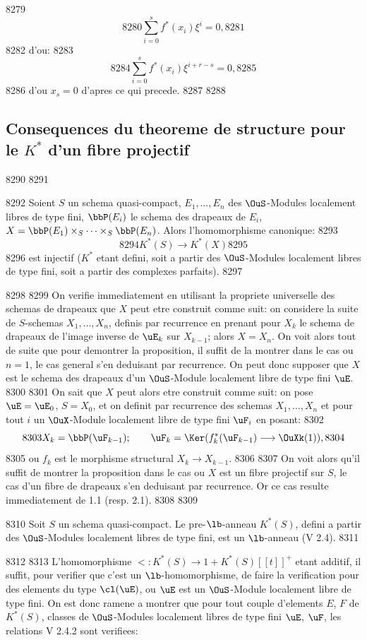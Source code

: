   8279	\[
  8280	\sum_{i=0}^{s} f^*(x_i)\xi^i = 0,
  8281	\]
  8282	d'ou:
  8283	\[
  8284	\sum_{i=0}^{s} f^*(x_i)\xi^{i+r-s} = 0,
  8285	\]
  8286	d'ou $x_s = 0$ d'apres ce qui precede.
  8287	
  8288		\subsection{Consequences du theoreme de structure pour le $K^*$ d'un fibre projectif}
  8290	
  8291	\begin{prop}
  8292	Soient $S$ un schema quasi-compact, $E_1, \ldots, E_n$ des $\OuS$-Modules localement libres de type fini, $\bbP(E_i)$ le schema des drapeaux de $E_i$, $X = \bbP(E_1) \times_S \cdots \times_S \bbP(E_n)$. Alors l'homomorphisme canonique:
  8293	\[
  8294	K^*(S) \longrightarrow K^*(X)
  8295	\]
  8296	est injectif ($K^*$ etant defini, soit a partir des $\OuS$-Modules localement libres de type fini, soit a partir des complexes parfaits).
  8297	\end{prop}
  8298	
  8299	On verifie immediatement en utilisant la propriete universelle des schemas de drapeaux que $X$ peut etre construit comme suit: on considere la suite de $S$-schemas $X_1, \ldots, X_n$, definis par recurrence en prenant pour $X_k$ le schema de drapeaux de l'image inverse de $\uE_k$ sur $X_{k-1}$; alors $X = X_n$. On voit alors tout de suite que pour demontrer la proposition, il suffit de la montrer dans le cas ou $n=1$, le cas general s'en deduisant par recurrence. On peut donc supposer que $X$ est le schema des drapeaux d'un $\OuS$-Module localement libre de type fini $\uE$.
  8300	
  8301	On sait que $X$ peut alors etre construit comme suit: on pose $\uE = \uE_0$, $S = X_0$, et on definit par recurrence des schemas $X_1, \ldots, X_n$ et pour tout $i$ un $\OuX$-Module localement libre de type fini $\uF_i$ en posant:
  8302	\[
  8303	X_k = \bbP(\uF_{k-1}); \qquad \uF_k = \Ker(f_k^*(\uF_{k-1}) \longrightarrow \OuXk(1)),
  8304	\]
  8305	ou $f_k$ est le morphisme structural $X_k \longrightarrow X_{k-1}$.
  8306	
  8307	On voit alors qu'il suffit de montrer la proposition dans le cas ou $X$ est un fibre projectif sur $S$, le cas d'un fibre de drapeaux s'en deduisant par recurrence. Or ce cas resulte immediatement de 1.1 (resp. 2.1).
  8308	
  8309	\begin{thm}
  8310	Soit $S$ un schema quasi-compact. Le pre-$\lb$-anneau $K^*(S)$, defini a partir des $\OuS$-Modules localement libres de type fini, est un $\lb$-anneau (V 2.4).
  8311	\end{thm}
  8312	
  8313	L'homomorphisme $\lt : K^*(S) \longrightarrow 1 + K^*(S)[[t]]^+$ etant additif, il suffit, pour verifier que c'est un $\lb$-homomorphisme, de faire la verification pour des elements du type $\cl(\uE)$, ou $\uE$ est un $\OuS$-Module localement libre de type fini. On est donc ramene a montrer que pour tout couple d'elements $E$, $F$ de $K^*(S)$, classes de $\OuS$-Modules localement libres de type fini $\uE$, $\uF$, les relations V 2.4.2 sont verifiees:
